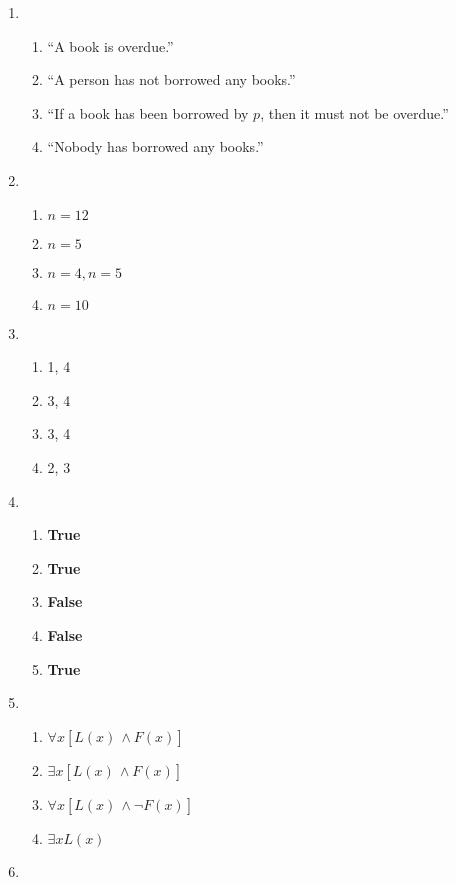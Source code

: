 \begin{enumerate}[leftmargin=2cm,labelsep=.5cm,label=\bf\arabic*.]
\item
  	\begin{enumerate}
  \item ``A book is overdue.''
  \item ``A person has not borrowed any books.''
  \item ``If a book has been borrowed by $p$, then it must not be overdue.''
  \item ``Nobody has borrowed any books.''\\[5mm]
\end{enumerate}
 
\item
  	\begin{enumerate}
  \item $n=12$
  \item $n=5$
  \item $n=4, n=5$
  \item $n=10$
\end{enumerate}\newpage

\item
  	\begin{enumerate}
  \item 1, 4
  \item 3, 4
  \item 3, 4
  \item 2, 3\\[5mm]
\end{enumerate}

\item
  	\begin{enumerate}
  \item \textbf{True}
  \item \textbf{True}
  \item \textbf{False}
  \item \textbf{False}
  \item \textbf{True}\\[5mm]
\end{enumerate}

\item
  	\begin{enumerate}
  \item $\forall x \left[L(x)\frac{}{} \wedge F(x)\right]$
  \item $\exists x \left[L(x)\frac{}{} \wedge F(x)\right]$
  \item $\forall x \left[L(x)\frac{}{} \wedge \neg F(x)\right]$
  \item $\exists x L(x)$\\[5mm]
\end{enumerate}

\item

\end{enumerate}